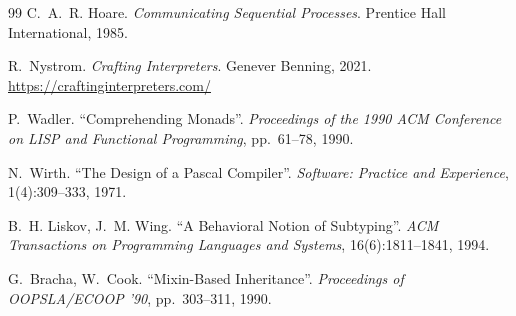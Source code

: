 \documentclass[11pt,a4paper,oneside,openany]{report}
\begin{document}
\begin{thebibliography}{99}
C.~A.~R. Hoare.
\textit{Communicating Sequential Processes}.
Prentice Hall International, 1985.

R.~Nystrom.
\textit{Crafting Interpreters}.
Genever Benning, 2021.
\url{https://craftinginterpreters.com/}

P.~Wadler.
``Comprehending Monads''.
\textit{Proceedings of the 1990 ACM Conference on LISP and Functional
Programming}, pp.~61--78, 1990.

N.~Wirth.
``The Design of a Pascal Compiler''.
\textit{Software: Practice and Experience}, 1(4):309--333, 1971.

B.~H. Liskov, J.~M. Wing.
``A Behavioral Notion of Subtyping''.
\textit{ACM Transactions on Programming Languages and Systems},
16(6):1811--1841, 1994.

G.~Bracha, W.~Cook.
``Mixin-Based Inheritance''.
\textit{Proceedings of OOPSLA/ECOOP '90}, pp.~303--311, 1990.

\end{thebibliography}
\end{document}
